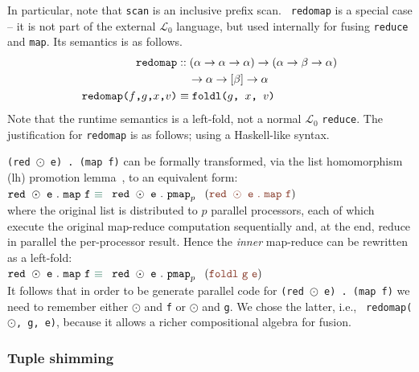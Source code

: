 \documentclass{sigplanconf}  %
\newcommand{\emp}[1]{\textcolor{DikuRed}{ #1}}
\newcommand{\emphh}[1]{\textcolor{CosGreen}{ #1}}
\newcommand{\LO}{$\mathcal{L}_0$}
\begin{document}
In particular, note that {\tt scan} is an inclusive prefix scan.  {\tt
  redomap} is a special case -- it is not part of the external \LO{}
language, but used internally for fusing {\tt reduce} and {\tt map}.
Its semantics is as follows.
\begin{align*}
\text{\tt redomap}
& :: (\alpha\rightarrow\alpha\rightarrow\alpha)\rightarrow(\alpha\rightarrow\beta\rightarrow\alpha)\\
& \quad\rightarrow\alpha\rightarrow[\beta]\rightarrow\alpha \\
\text{\tt redomap($f$,$g$,$x$,$v$)} & \equiv \text{\tt foldl($g$, $x$, $v$)}
\end{align*}
Note that the runtime semantics is a left-fold, not a normal \LO{}
\texttt{reduce}.  The justification for {\tt redomap} is as follows;
using a Haskell-like syntax.

{\tt (red $\odot$ e) . (map f)} can be formally transformed, via the
list homomorphism ({\sc lh}) promotion lemma~\cite{BirdListTh}, to an
equivalent form:  \\
${\tt red}\mbox{ }\odot\mbox{ }{\tt e}\mbox{ }.\mbox{ }{\tt map}\mbox{
}{\tt f}\mbox{ }\emphh{\equiv}$ $\mbox{ }{\tt red}\mbox{ }\odot\mbox{
}{\tt e}\mbox{ }.\mbox{ }{\tt pmap}_{p} \mbox{ }$ $(\emp{{\tt red} \mbox{
  }\odot\mbox{ }{\tt e}\mbox{ }.\mbox{ }{\tt map}\mbox{ }{\tt f}})$\\
where the original list is distributed to $p$ parallel processors,
each of which execute the original map-reduce computation sequentially
and, at the end, reduce in parallel the per-processor result.  Hence
the {\em inner} map-reduce can be
rewritten as a left-fold:\\
${\tt red}\mbox{ }\odot\mbox{ }{\tt e}\mbox{ }.\mbox{ }{\tt map}\mbox{
}{\tt f}\mbox{ }\emphh{\equiv}$ $\mbox{ }{\tt red}\mbox{ }\odot\mbox{
}{\tt e}\mbox{ }.\mbox{ }{\tt pmap}_{p} \mbox{ }$ $(\emp{{\tt foldl}\mbox{
  }{\tt g}\mbox{ }{\tt e}})$\\
It follows that in order to be generate parallel code for {\tt (red
  $\odot$ e) . (map f)} we need to remember either $\odot$ and {\tt f}
or $\odot$ and {\tt g}. We chose the latter, i.e., {\tt
  redomap($\odot$, g, e)}, because it allows a richer compositional
algebra for fusion.

\subsubsection{Tuple shimming}
\label{sec:shimming}
\end{document}
